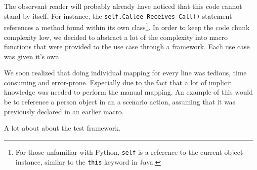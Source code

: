 \noindent
The observant reader will probably already have noticed that this code cannot stand by itself. For instance, the \texttt{self.Callee\_Receives\_Call()} statement references a method found within its own class\footnote{For those unfamiliar with Python, \texttt{self} is a reference to the current object instance, similar to the \texttt{this} keyword in Java.}. In order to keep the code chunk complexity low, we decided to abstract a lot of the complexity into macro functions that were provided to the use case through a framework. Each use case was given it's own


We soon realized that doing individual mapping for every line was tedious, time consuming and error-prone. Especially due to the fact that a lot of implicit knowledge was needed to perform the manual mapping. An example of this would be to reference a person object in an a scenario action, assuming that it was previously declared in an earlier macro.


A lot about about the test framework.